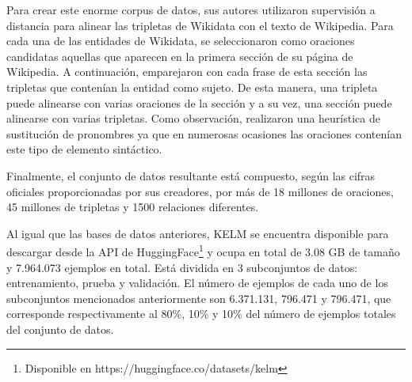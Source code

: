 Para crear este enorme corpus de datos, sus autores utilizaron supervisión a distancia para alinear las tripletas de Wikidata con el texto de Wikipedia. Para cada una de las entidades de Wikidata, se seleccionaron como oraciones candidatas aquellas que aparecen en la primera sección de su página de Wikipedia. A continuación, emparejaron con cada frase de esta sección las tripletas que contenían la entidad como sujeto. De esta manera, una tripleta puede alinearse con varias oraciones de la sección y a su vez, una sección puede alinearse con varias tripletas. Como observación, realizaron una heurística de sustitución de pronombres ya que en numerosas ocasiones las oraciones contenían este tipo de elemento sintáctico.
 
Finalmente, el conjunto de datos resultante está compuesto, según las cifras oficiales proporcionadas por sus creadores, por más de 18 millones de oraciones, 45 millones de tripletas y 1500 relaciones diferentes.




Al igual que las bases de datos anteriores, KELM se encuentra disponible para descargar desde la API de HuggingFace\footnote{Disponible en https://huggingface.co/datasets/kelm} y ocupa en total de 3.08 GB de tamaño y 7.964.073 ejemplos en total. Está dividida en 3 subconjuntos de datos: entrenamiento, prueba y validación. El número de ejemplos de cada uno de los subconjuntos mencionados anteriormente son 6.371.131, 796.471 y 796.471, que corresponde respectivamente al 80\%, 10\% y 10\% del número de ejemplos totales del conjunto de datos. 

